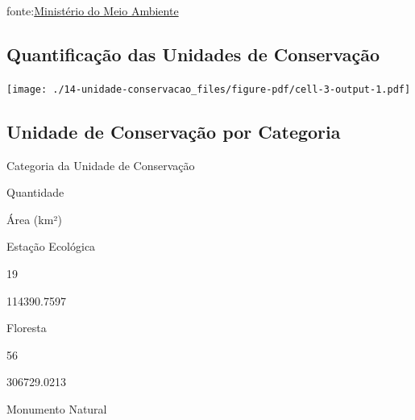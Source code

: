 \documentclass[
  letterpaper,
]{report}
\begin{document}
fonte:\href{https://antigo.mma.gov.br/informma/item/15713-o-que-s\%C3\%A3o-as-unidades-de-conserva\%C3\%A7\%C3\%A3o.html}{Ministério
do Meio Ambiente}

\hypertarget{quantificauxe7uxe3o-das-unidades-de-conservauxe7uxe3o}{%
\subsection{Quantificação das Unidades de
Conservação}\label{quantificauxe7uxe3o-das-unidades-de-conservauxe7uxe3o}}

\texttt{[image: ./14-unidade-conservacao\_files/figure-pdf/cell-3-output-1.pdf]}

\hypertarget{unidade-de-conservauxe7uxe3o-por-categoria}{%
\subsection{Unidade de Conservação por
Categoria}\label{unidade-de-conservauxe7uxe3o-por-categoria}}

\n  

\n    

\n      

Categoria da Unidade de Conservação

\n      

Quantidade

\n      

Área (km²)

\n    

\n  

\n  

\n    

\n      

Estação Ecológica

\n      

19

\n      

114390.7597

\n    

\n    

\n      

Floresta

\n      

56

\n      

306729.0213

\n    

\n    

\n      

Monumento Natural

\n      
\end{document}
